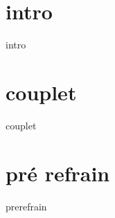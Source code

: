 
\songbooksongstruct

\newpage

\begin{multicols}{2}
	\songlyrics
\end{multicols}

\newpage
\section*{intro}
{intro}
\section*{couplet}
{couplet}
\section*{pré refrain}
{prerefrain}
